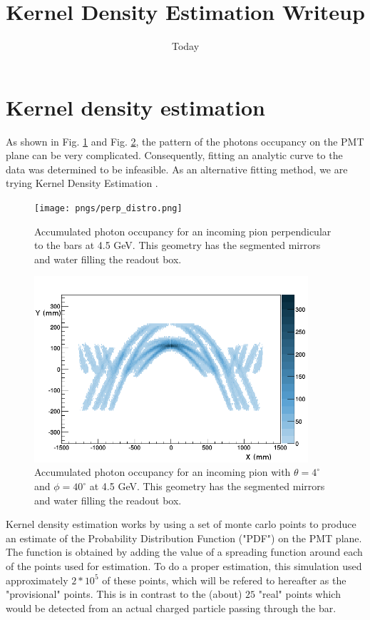 \documentclass[11pt]{article}
\begin{document}
\title{Kernel Density Estimation Writeup}
\date{Today}
\maketitle

\section{Kernel density estimation}
As shown in Fig. \ref{fig:perp_distribution} and Fig. \ref{fig:distribution}, the pattern of the photons occupancy on the PMT plane can be very complicated.  Consequently, fitting an analytic curve to the data was determined to be infeasible.  As an alternative fitting method, we are trying Kernel Density Estimation \cite{rosenblatt1956}.
\begin{figure}
\centering
\texttt{[image: pngs/perp\_distro.png]}
\caption{Accumulated photon occupancy for an incoming pion perpendicular to the bars at 4.5 GeV.  This geometry has the segmented mirrors and water filling the readout box.\label{fig:perp_distribution}}
\end{figure}
\begin{figure}
\centering
\includegraphics[width=4in]{pngs/fitdirc_ang440_3seg_index_5000MeV_133_pion_dist.png}
\caption{Accumulated photon occupancy for an incoming pion with $\theta=4^{\circ}$ and $\phi=40^{\circ}$ at 4.5 GeV.  This geometry has the segmented mirrors and water filling the readout box.\label{fig:distribution}}
\end{figure}
Kernel density estimation works by using a set of monte carlo points to produce an estimate of the Probability Distribution Function ("PDF") on the PMT plane.  The function is obtained by adding the value of a spreading function around each of the points used for estimation.  To do a proper estimation, this simulation used approximately $2*10^5$ of these points, which will be refered to hereafter as the "provisional" points.  This is in contrast to the (about) $25$ "real" points which would be detected from an actual charged particle passing through the bar.
\end{document}
